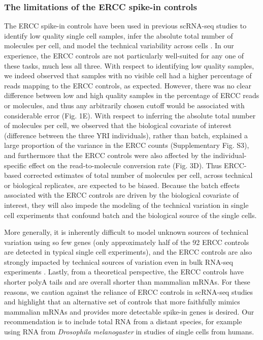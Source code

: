 \subsubsection{The limitations of the ERCC spike-in
controls}\label{the-limitations-of-the-ercc-spike-in-controls}

The ERCC spike-in controls have been used in previous scRNA-seq studies
to identify low quality single cell samples, infer the absolute total
number of molecules per cell, and model the technical variability across
cells \citep{Brennecke2013, Grun2014, Ding2015, Vallejos2015}. In our
experience, the ERCC controls are not particularly well-suited for any
one of these tasks, much less all three. With respect to identifying low
quality samples, we indeed observed that samples with no visible cell
had a higher percentage of reads mapping to the ERCC controls, as
expected. However, there was no clear difference between low and high
quality samples in the percentage of ERCC reads or molecules, and thus
any arbitrarily chosen cutoff would be associated with considerable
error (Fig. 1E). With respect to inferring the absolute total number of
molecules per cell, we observed that the biological covariate of
interest (difference between the three YRI individuals), rather than
batch, explained a large proportion of the variance in the ERCC counts
(Supplementary Fig. S3), and furthermore that the ERCC controls were
also affected by the individual-specific effect on the read-to-molecule
conversion rate (Fig. 3D). Thus ERCC-based corrected estimates of total
number of molecules per cell, across technical or biological replicates,
are expected to be biased. Because the batch effects associated with the
ERCC controls are driven by the biological covariate of interest, they
will also impede the modeling of the technical variation in single cell
experiments that confound batch and the biological source of the single
cells.

More generally, it is inherently difficult to model unknown sources of
technical variation using so few genes \citep{Risso2014} (only
approximately half of the 92 ERCC controls are detected in typical
single cell experiments), and the ERCC controls are also strongly
impacted by technical sources of variation even in bulk RNA-seq
experiments \citep{SEQC/MAQC-IIIConsortium2014}. Lastly, from a
theoretical perspective, the ERCC controls have shorter polyA tails and
are overall shorter than mammalian mRNAs. For these reasons, we caution
against the reliance of ERCC controls in scRNA-seq studies and highlight
that an alternative set of controls that more faithfully mimics
mammalian mRNAs and provides more detectable spike-in genes is desired.
Our recommendation is to include total RNA from a distant species, for
example using RNA from \emph{Drosophila} \emph{melanogaster} in studies
of single cells from humans.

